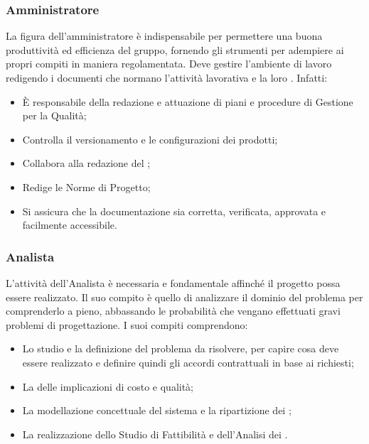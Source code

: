 \documentclass[NormeDiProgetto.tex]{subfiles}
\begin{document}
	\subsubsection{Amministratore}
	La figura dell'amministratore è indispensabile per permettere una buona produttività ed efficienza del gruppo, fornendo gli strumenti per adempiere ai propri compiti in maniera regolamentata. Deve gestire l'ambiente di lavoro redigendo i documenti che normano l'attività lavorativa e la loro . Infatti:
	\begin{itemize}
		\item È responsabile della redazione e attuazione di piani e procedure di Gestione per la Qualità;
		\item Controlla il versionamento e le configurazioni dei prodotti;
		\item Collabora alla redazione del \pdp;
		\item Redige le Norme di Progetto;
		\item Si assicura che la documentazione sia corretta, verificata, approvata e facilmente accessibile.
	\end{itemize}

	\subsubsection{Analista}
	L'attività dell'Analista è necessaria e fondamentale affinché il progetto possa essere realizzato. Il suo compito è quello di analizzare il dominio del problema per comprenderlo a pieno, abbassando le probabilità che vengano effettuati gravi problemi di progettazione. I suoi compiti comprendono:
	\begin{itemize}
		\item Lo studio e la definizione del problema da risolvere, per capire cosa deve essere realizzato e definire quindi gli accordi contrattuali in base ai  richiesti;
		\item La  delle implicazioni di costo e qualità;
		\item La modellazione concettuale del sistema e la ripartizione dei ;
		\item La realizzazione dello Studio di Fattibilità e dell'Analisi dei .
	\end{itemize}
\end{document}
